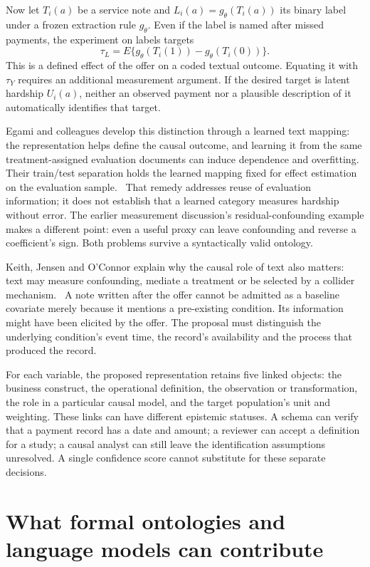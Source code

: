 Now let \(T_i(a)\) be a service note and \(L_i(a)=g_\theta(T_i(a))\) its binary
label under a frozen extraction rule \(g_\theta\). Even if the label is named
after missed payments, the experiment on labels targets
\[
 \tau_L=E\{g_\theta(T_i(1))-g_\theta(T_i(0))\}.
\]
This is a defined effect of the offer on a coded textual outcome. Equating it
with \(\tau_Y\) requires an additional measurement argument. If the desired
target is latent hardship \(U_i(a)\), neither an observed payment nor a
plausible description of it automatically identifies that target.

Egami and colleagues develop this distinction through a learned text mapping:
the representation helps define the causal outcome, and learning it from the
same treatment-assigned evaluation documents can induce dependence and
overfitting. Their train/test separation holds the learned mapping fixed for
effect estimation on the evaluation sample.~\citep{exec13_census_texts}
That remedy addresses reuse of evaluation information; it does not establish
that a learned category measures hardship without error. The earlier
measurement discussion's residual-confounding example makes a different
point: even a useful proxy can leave confounding and reverse a coefficient's
sign. Both problems survive a syntactically valid ontology.

Keith, Jensen and O'Connor explain why the causal role of text also matters:
text may measure confounding, mediate a treatment or be selected by a collider
mechanism.~\citep{exec13_census_text_review_arxiv} A note written after the offer
cannot be admitted as a baseline covariate merely because it mentions a
pre-existing condition. Its information might have been elicited by the offer.
The proposal must distinguish the underlying condition's event time, the
record's availability and the process that produced the record.

For each variable, the proposed representation retains five linked objects:
the business construct, the operational definition, the observation or
transformation, the role in a particular causal model, and the target
population's unit and weighting. These links can have different epistemic
statuses. A schema can verify that a payment record has a date and amount;
a reviewer can accept a definition for a study; a causal analyst can still
leave the identification assumptions unresolved. A single confidence score
cannot substitute for these separate decisions.

\section{What formal ontologies and language models can contribute}

